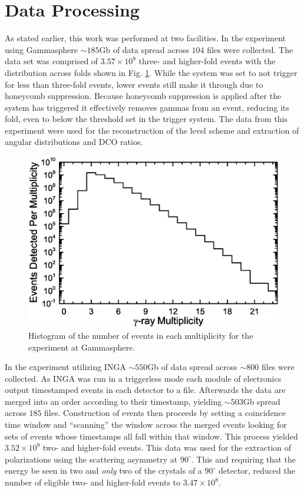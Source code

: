 \section{Data Processing}
\label{sec:exp-pr-data-proc}
 As stated earlier, this work was performed at two facilities. In the experiment using Gammasphere $\sim{}185$Gb of data spread across $104$ files were collected. The data set was comprised of $3.57\times{}10^9$ three- and higher-fold events with the distribution across folds shown in Fig. \ref{fig:chp3-gs_event_pattern}. While the system was set to not trigger for less than three-fold events, lower events still make it through due to honeycomb suppression. Because honeycomb suppression is applied after the system has triggered it effectively removes gammas from an event, reducing its fold, even to below the threshold set in the trigger system. The data from this experiment were used for the reconstruction of the level scheme and extraction of angular distributions and DCO ratios.
 
\begin{figure}[h!]
	\centerline{\includegraphics[height=0.25\textheight]{./img/c3/gs_event_plot.eps}}
	\caption{Histogram of the number of events in each multiplicity for the experiment at Gammasphere.}
	\label{fig:chp3-gs_event_pattern}
\end{figure}
 
In the experiment utilizing INGA $\sim{}550$Gb of data spread across $\sim800$ files were collected. As INGA was run in a triggerless mode each module of electronics output timestamped events in each detector to a file. Afterwards the data are merged into an order according to their timestamp, yielding $\sim{}503$Gb spread across $185$ files. Construction of events then proceeds by setting a coincidence time window and ``scanning'' the window across the merged events looking for sets of events whose timestamps all fall within that window. This process yielded $3.52\times{}10^9$ two- and higher-fold events. This data was used for the extraction of polarizations using the scattering asymmetry at $90^{\circ{}}$. This and requiring that the energy be seen in two and \emph{only} two of the crystals of a $90^{\circ{}}$ detector, reduced the number of eligible two- and higher-fold events to $3.47\times{}10^8$.
 
